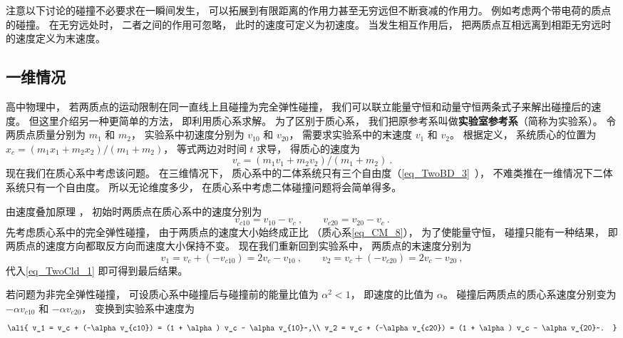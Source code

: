 

注意以下讨论的碰撞不必要求在一瞬间发生， 可以拓展到有限距离的作用力甚至无穷远但不断衰减的作用力。 例如考虑两个带电荷的质点的碰撞。 在无穷远处时， 二者之间的作用可忽略， 此时的速度可定义为初速度。 当发生相互作用后， 把两质点互相远离到相距无穷远时的速度定义为末速度。

\subsection{一维情况}
高中物理中， 若两质点的运动限制在同一直线上且碰撞为完全弹性碰撞， 我们可以联立能量守恒和动量守恒两条式子来解出碰撞后的速度。 
但这里介绍另一种更简单的方法， 即利用质心系求解。 为了区别于质心系， 我们把原参考系叫做\textbf{实验室参考系}（简称为实验系）。 令两质点质量分别为 $m_1$ 和 $m_2$， 实验系中初速度分别为 $v_{10}$ 和 $v_{20}$， 需要求实验系中的末速度 $v_1$ 和 $v_2$。 根据定义， 系统质心的位置为 $x_c = (m_1 x_1 + m_2 x_2)/(m_1 + m_2)$， 等式两边对时间 $t$ 求导， 得质心的速度为
\begin{equation}\label{eq_TwoCld_1}
v_c = (m_1 v_1 + m_2 v_2)/(m_1 + m_2)~.
\end{equation}
现在我们在质心系中考虑该问题。 在三维情况下， 质心系中的二体系统只有三个自由度（\autoref{eq_TwoBD_3}~）， 不难类推在一维情况下二体系统只有一个自由度。 所以无论维度多少， 在质心系中考虑二体碰撞问题将会简单得多。 

由速度叠加原理%
， 初始时两质点在质心系中的速度分别为
\begin{equation}
v_{c10} = v_{10} - v_c~, \qquad v_{c20} = v_{20} - v_c~.
\end{equation}
先考虑质心系中的完全弹性碰撞， 由于两质点的速度大小始终成正比 （质心系\autoref{eq_CM_8}）， 为了使能量守恒， 碰撞只能有一种结果， 即两质点的速度方向都取反方向而速度大小保持不变。 现在我们重新回到实验系中， 两质点的末速度分别为
\begin{equation}
v_1 = v_c + (-v_{c10}) = 2v_c - v_{10}  ~,\qquad v_2 = v_c + (-v_{c20}) = 2v_c - v_{20}~,
\end{equation}
代入\autoref{eq_TwoCld_1} 即可得到最后结果。

若问题为非完全弹性碰撞， 可设质心系中碰撞后与碰撞前的能量比值为 $\alpha^2 < 1$， 即速度的比值为 $\alpha$。 碰撞后两质点的质心系速度分别变为 $-\alpha v_{c10}$ 和 $-\alpha v_{c20}$， 变换到实验系中速度为
\begin{equation}\ali{
v_1 = v_c + (-\alpha v_{c10}) = (1 + \alpha) v_c - \alpha v_{10}~,\\
v_2 = v_c + (-\alpha v_{c20}) = (1 + \alpha) v_c - \alpha v_{20}~.
}\end{equation}


